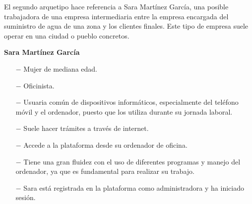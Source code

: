 \documentclass[pdftex,11pt,a4paper]{book}
\begin{document}
El segundo arquetipo hace referencia a Sara Martínez García, una posible trabajadora de una empresa intermediaria entre la empresa encargada del suministro de agua de una zona y los clientes finales. Este tipo de empresa suele operar en una ciudad o pueblo concretos.

\vspace{5mm}
\textbf{Sara Martínez García}
\vspace{-4mm}
\begin{itemize}
\addtolength{\itemsep}{-2mm}
\item [$-$] Mujer de mediana edad.
\item [$-$] Oficinista.
\item [$-$] Usuaria común de dispositivos informáticos, especialmente del teléfono móvil y el ordenador, puesto que los utiliza durante su jornada laboral.
\item [$-$] Suele hacer trámites a través de internet.
\item [$-$] Accede a la plataforma desde su ordenador de oficina.
\item [$-$] Tiene una gran fluidez con el uso de diferentes programas y manejo del ordenador, ya que es fundamental para realizar su trabajo.
\item [$-$] Sara está registrada en la plataforma como administradora y ha iniciado sesión.
\end{itemize}

\vspace{5mm}

\renewcommand{\tablename}{Tabla}
\renewcommand{\arraystretch}{1,7}
\end{document}
